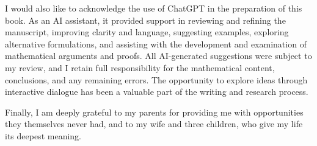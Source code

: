 I would also like to acknowledge the use of ChatGPT in the preparation of this book. As an AI assistant, it provided support in reviewing and refining the manuscript, improving clarity and language, suggesting examples, exploring alternative formulations, and assisting with the development and examination of mathematical arguments and proofs. All AI-generated suggestions were subject to my review, and I retain full responsibility for the mathematical content, conclusions, and any remaining errors. The opportunity to explore ideas through interactive dialogue has been a valuable part of the writing and research process.

Finally, I am deeply grateful to my parents for providing me with opportunities they themselves never had, and to my wife and three children, who give my life its deepest meaning.